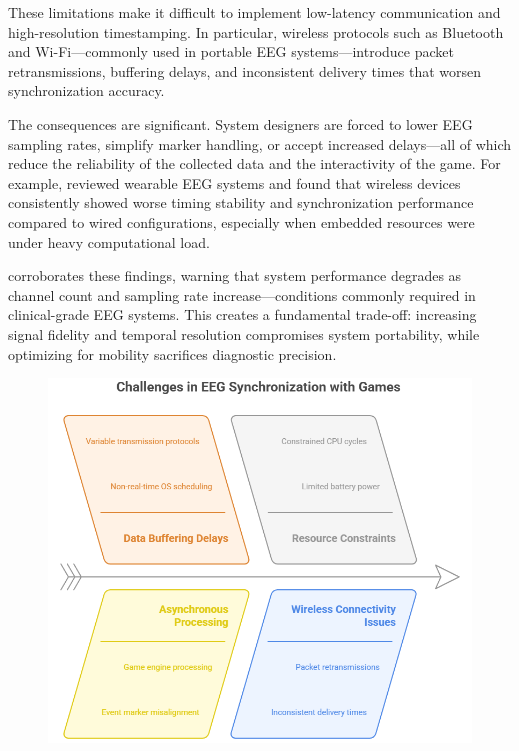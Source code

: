 These limitations make it difficult to implement low-latency communication and high-resolution timestamping. In particular, wireless protocols such as Bluetooth and Wi-Fi—commonly used in portable EEG systems—introduce packet retransmissions, buffering delays, and inconsistent delivery times that worsen synchronization accuracy.

The consequences are significant. System designers are forced to lower EEG sampling rates, simplify marker handling, or accept increased delays—all of which reduce the reliability of the collected data and the interactivity of the game. For example, \cite{liu2024fpga} reviewed wearable EEG systems and found that wireless devices consistently showed worse timing stability and synchronization performance compared to wired configurations, especially when embedded resources were under heavy computational load.

\cite{brainproducts2024lsl} corroborates these findings, warning that system performance degrades as channel count and sampling rate increase—conditions commonly required in clinical-grade EEG systems. This creates a fundamental trade-off: increasing signal fidelity and temporal resolution compromises system portability, while optimizing for mobility sacrifices diagnostic precision.

\begin{figure}
    \centering
    \includegraphics[width=0.8\linewidth]{Figures/state of the art.png}
    \caption{}
    \label{fig:Esquema}
\end{figure}






